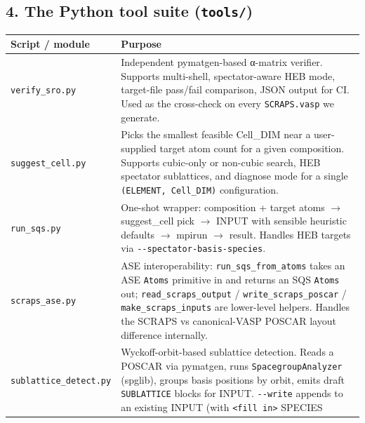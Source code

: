 \documentclass[
  11pt,
]{article}
\begin{document}
\subsection{\texorpdfstring{4. The Python tool suite
(\texttt{tools/})}{4. The Python tool suite (tools/)}}\label{the-python-tool-suite-tools}

\begin{longtable}[]{@{}
  >{\raggedright\arraybackslash}p{}
  >{\raggedright\arraybackslash}p{}@{}}
\toprule\noalign{}
\begin{minipage}[b]{\linewidth}\raggedright
Script / module
\end{minipage} & \begin{minipage}[b]{\linewidth}\raggedright
Purpose
\end{minipage} \\
\midrule\noalign{}
\endhead
\bottomrule\noalign{}
\endlastfoot
\texttt{verify\_sro.py} & Independent pymatgen-based α-matrix verifier.
Supports multi-shell, spectator-aware HEB mode, target-file pass/fail
comparison, JSON output for CI. Used as the cross-check on every
\texttt{SCRAPS.vasp} we generate. \\
\texttt{suggest\_cell.py} & Picks the smallest feasible Cell\_DIM near a
user-supplied target atom count for a given composition. Supports
cubic-only or non-cubic search, HEB spectator sublattices, and diagnose
mode for a single \texttt{(ELEMENT,\ Cell\_DIM)} configuration. \\
\texttt{run\_sqs.py} & One-shot wrapper: composition + target atoms
\(\to\) suggest\_cell pick \(\to\) INPUT with sensible heuristic
defaults \(\to\) mpirun \(\to\) result. Handles HEB targets via
\texttt{-\/-spectator-basis-species}. \\
\texttt{scraps\_ase.py} & ASE interoperability:
\texttt{run\_sqs\_from\_atoms} takes an ASE \texttt{Atoms} primitive in
and returns an SQS \texttt{Atoms} out; \texttt{read\_scraps\_output} /
\texttt{write\_scraps\_poscar} / \texttt{make\_scraps\_inputs} are
lower-level helpers. Handles the SCRAPS vs canonical-VASP POSCAR layout
difference internally. \\
\texttt{sublattice\_detect.py} & Wyckoff-orbit-based sublattice
detection. Reads a POSCAR via pymatgen, runs \texttt{SpacegroupAnalyzer}
(spglib), groups basis positions by orbit, emits draft
\texttt{SUBLATTICE} blocks for INPUT. \texttt{-\/-write} appends to an
existing INPUT (with \texttt{\textless{}fill\ in\textgreater{}} SPECIES

\end{longtable}
\end{document}
